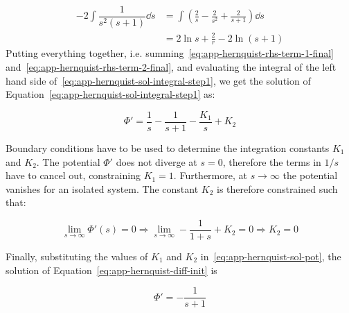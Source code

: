 \begin{align}
        \label{eq:app-hernquist-rhs-term-2-final}
        -2\int  \dfrac{1}{s^2(s+1)} \dd s &=  \int \left( \frac{2}{s} - \frac{2}{s^2} + \frac{2}{s+1} \right) \dd s \nonumber \\ 
        &=  2\ln{s} + \frac{2}{r} - 2\ln{(s+1)}
\end{align} Putting everything together, i.e. summing~\eqref{eq:app-hernquist-rhs-term-1-final} and~\eqref{eq:app-hernquist-rhs-term-2-final}, and evaluating the integral of the left hand side of~\eqref{eq:app-hernquist-sol-integral-step1}, we get the solution of Equation~\eqref{eq:app-hernquist-sol-integral-step1} as:

\begin{equation}
    \label{eq:app-hernquist-sol-pot}
    \Phi' = \frac{1}{s} - \frac{1}{s+1} - \frac{K_1}{s} + K_2
\end{equation}

Boundary conditions have to be used to determine the integration constants $K_1$ and $K_2$. The potential $\Phi'$ does not diverge at $s=0$, therefore the terms in $1/s$ have to cancel out, constraining $K_1=1$. Furthermore, at $s \to \infty$ the potential vanishes for an isolated system. The constant $K_2$ is therefore constrained such that:

\begin{equation}
    \label{eq:app-boundary-const-K2}
    \lim_{s \to \infty} \Phi'(s)=0 \Rightarrow \lim_{s \to \infty} -\frac{1}{1 + s} + K_2 = 0 \Rightarrow K_2 =0
\end{equation}

Finally, substituting the values of $K_1$ and $K_2$ in~\eqref{eq:app-hernquist-sol-pot}, the solution of Equation~\eqref{eq:app-hernquist-diff-init} is 

\begin{equation}
    \label{eq:app-hernquist-solution}
    \boxed{\Phi' = - \frac{1}{s+1}}
\end{equation}